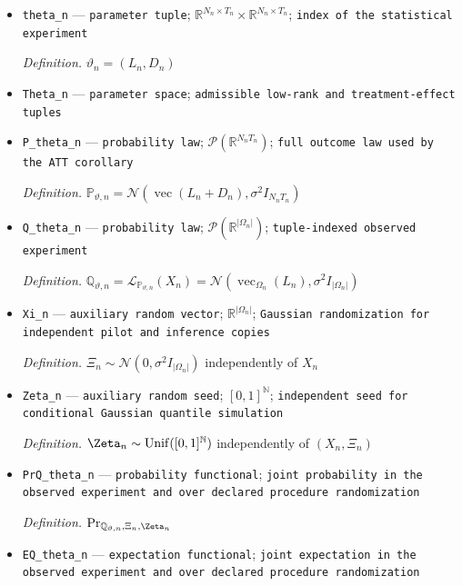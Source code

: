 \documentclass{article}
\begin{document}
\begin{itemize}
  \item \texttt{theta\_\allowbreak{}n} --- \texttt{parameter tuple}; \(\mathbb R^{N_n\times T_n}\times\mathbb R^{N_n\times T_n}\); \texttt{index of the statistical experiment}
  \par\smallskip\noindent\emph{Definition.} \(\vartheta_n=(L_n,D_n)\)
  \item \texttt{Theta\_\allowbreak{}n} --- \texttt{parameter space}; \texttt{admissible low-\allowbreak{}rank and treatment-\allowbreak{}effect tuples}
  \item \texttt{P\_\allowbreak{}theta\_\allowbreak{}n} --- \texttt{probability law}; \(\mathcal P(\mathbb R^{N_nT_n})\); \texttt{full outcome law used by the ATT corollary}
  \par\smallskip\noindent\emph{Definition.} \(\mathbb P_{\vartheta,n}=\mathcal N(\operatorname{vec}(L_n+D_n),\sigma^2I_{N_nT_n})\)
  \item \texttt{Q\_\allowbreak{}theta\_\allowbreak{}n} --- \texttt{probability law}; \(\mathcal P(\mathbb R^{|\Omega_n|})\); \texttt{tuple-\allowbreak{}indexed observed experiment}
  \par\smallskip\noindent\emph{Definition.} \(\mathbb Q_{\vartheta,n}=\mathcal L_{\mathbb P_{\vartheta,n}}(X_n)=\mathcal N(\operatorname{vec}_{\Omega_n}(L_n),\sigma^2I_{|\Omega_n|})\)
  \item \texttt{Xi\_\allowbreak{}n} --- \texttt{auxiliary random vector}; \(\mathbb R^{|\Omega_n|}\); \texttt{Gaussian randomization for independent pilot and inference copies}
  \par\smallskip\noindent\emph{Definition.} \(\Xi_n\sim\mathcal N(0,\sigma^2I_{|\Omega_n|})\) independently of \(X_n\)
  \item \texttt{Zeta\_\allowbreak{}n} --- \texttt{auxiliary random seed}; \([0,1]^{\mathbb N}\); \texttt{independent seed for conditional Gaussian quantile simulation}
  \par\smallskip\noindent\emph{Definition.} \(\Zeta_n\sim\operatorname{Unif}([0,1]^{\mathbb N})\) independently of \((X_n,\Xi_n)\)
  \item \texttt{PrQ\_\allowbreak{}theta\_\allowbreak{}n} --- \texttt{probability functional}; \texttt{joint probability in the observed experiment and over declared procedure randomization}
  \par\smallskip\noindent\emph{Definition.} \(\Pr_{\mathbb Q_{\vartheta,n},\Xi_n,\Zeta_n}\)
  \item \texttt{EQ\_\allowbreak{}theta\_\allowbreak{}n} --- \texttt{expectation functional}; \texttt{joint expectation in the observed experiment and over declared procedure randomization}

\end{itemize}
\end{document}
